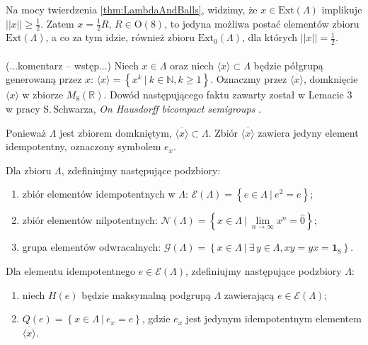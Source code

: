 {Na mocy twierdzenia \ref{thm:LambdaAndBalls},
widzimy, że $x \in \text{Ext}(\Lambda)$ implikuje
    $||x|| \geq \frac{1}{2}$.
Zatem $x = \frac{1}{2} R$, $R \in \mathrm{O}(8)$,
to jedyna możliwa postać elementów zbioru $\text{Ext}(\Lambda)$,
a co za tym idzie, również zbioru $\text{Ext}_{0}(\Lambda)$,
dla których $||x|| = \frac{1}{2}$.

\paragraph{}
(...komentarz -- wstęp...)
Niech $x \in \Lambda$ oraz niech
$\langle x \rangle \subset \Lambda$ będzie półgrupą generowaną przez $x$:
$\langle x \rangle = \left \{ x^{k} \: | \: k \in \mathbb{N}, k \geq 1 \right \}$.
Oznaczmy przez $\overline{\langle x \rangle}$,
domknięcie $\langle x \rangle$ w zbiorze $M_{8}(\mathbb{R})$.
Dowód następującego faktu zawarty został w Lemacie 3 w
pracy S.\,Schwarza, \emph{On Hausdorff bicompact semigroups}
\cite{schwarz1955hausdorff}.

\begin{Theorem}
    \label{prop:UniqeClusterPoint}
    Ponieważ $\Lambda$ jest zbiorem domkniętym, $\overline{\langle x \rangle} \subset \Lambda$.
    Zbiór $\overline{\langle x \rangle}$ zawiera jedyny element idempotentny,
    oznaczony symbolem $e_{x}$.
\end{Theorem}

\begin{Definition}
    Dla zbioru $\Lambda$, zdefiniujmy następujące podzbiory:
    \begin{enumerate}
       \item zbiór elementów idempotentnych w $\Lambda$:
            $\mathcal{E}(\Lambda) = \left \{ e \in \Lambda \: |  \: e^{2} = e \right \}$;
       \item zbiór elementów nilpotentnych:
            $\mathcal{N}(\Lambda) = \left \{ x \in \Lambda \: |  \: \lim \limits_{n \rightarrow \infty} x^{n} = \hat{0} \right \}$;
       \item grupa elementów odwracalnych:
            $\mathcal{G}(\Lambda) = \left \{ x \in \Lambda \: |  \: \exists \, y \in \Lambda, xy = yx = \mathbf{1}_{8} \right \}$.
    \end{enumerate}
   Dla elementu idempotentnego $e \in \mathcal{E}(\Lambda)$,
   zdefiniujmy następujące podzbiory $\Lambda$:
   \begin{enumerate}
        \item niech $H(e)$ będzie maksymalną podgrupą $\Lambda$
            zawierającą $e \in \mathcal{E}(\Lambda)$;
        \item $Q(e) = \left \{ x \in \Lambda \: | \: e_{x} = e \right \}$,
        gdzie $e_{x}$ jest jedynym idempotentnym elementem
        $\overline{\langle x \rangle}$.
   \end{enumerate}
\end{Definition}

}
